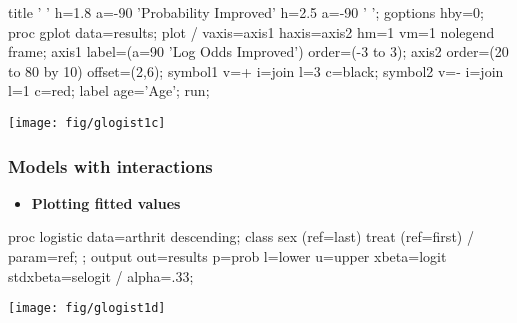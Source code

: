 \begin{frame}[fragile]

\begin{Input}[fontsize=\footnotesize,label=\fbox{$\cdots$ \texttt{glogist1c.sas}},baselinestretch=0.7,firstnumber=30]
title ' '
   h=1.8 a=-90 'Probability Improved'    
   h=2.5 a=-90 ' ';                      
goptions hby=0;                          
proc gplot data=results;
   plot  / 
         vaxis=axis1 haxis=axis2 hm=1 vm=1
         nolegend  frame;
   axis1 label=(a=90 'Log Odds Improved')
         order=(-3 to 3);
   axis2 order=(20 to 80 by 10) offset=(2,6);
   symbol1 v=+ i=join l=3 c=black;
   symbol2 v=- i=join l=1 c=red;
   label age='Age';
run;
\end{Input}
 \begin{center}
  \texttt{[image: fig/glogist1c]}
 \end{center}
\end{frame}

\begin{frame}[fragile]
  \frametitle{Models with interactions}
  \begin{itemize}
	\item{\large\bfseries Plotting fitted values}
  \end{itemize}
\begin{Input}
proc logistic data=arthrit descending;
   class sex (ref=last) treat (ref=first) / param=ref;
   ;
   output out=results p=prob l=lower u=upper
          xbeta=logit stdxbeta=selogit / alpha=.33;
\end{Input}

 \begin{center}
  \texttt{[image: fig/glogist1d]}
 \end{center}
\end{frame}

\endinput
\begin{frame}
  \frametitle{}
  \begin{itemize}
	\item{\large\bfseries }
      \begin{itemize*}
	  \item 
    	\begin{itemize*}
		\item 
		\item 
		\end{itemize*}
	  \item 
	  \end{itemize*}
	\item{\large\bfseries }
	\item{\large\bfseries }
  \end{itemize}
\end{frame}

